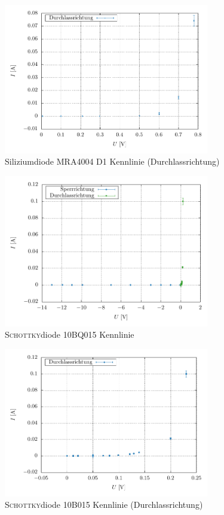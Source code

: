 \documentclass[a4paper,10pt]{article}
\numberwithin{equation}{section}
\begin{document}
\begin{figure}[h]
        \centering
        \includegraphics[width=0.8\textwidth]{plot/D1_durchlass_crop.pdf}
        \caption{Siliziumdiode MRA4004 D1 Kennlinie (Durchlassrichtung)} \label{fig:sidiode_kennlinie_durchlass}
\end{figure}
\begin{figure}[h]
        \centering
        \includegraphics[width=0.8\textwidth]{plot/D2_crop.pdf}
        \caption{\textsc{Schottky}diode 10BQ015 Kennlinie} \label{fig:schottky_kennlinie}
\end{figure}
\begin{figure}[h]
        \centering
        \includegraphics[width=0.8\textwidth]{plot/D2_durchlass_crop.pdf}
        \caption{\textsc{Schottky}diode 10B015 Kennlinie (Durchlassrichtung)} \label{fig:schottky_kennlinie_durchlass}
\end{figure}\\
\clearpage
\end{document}
